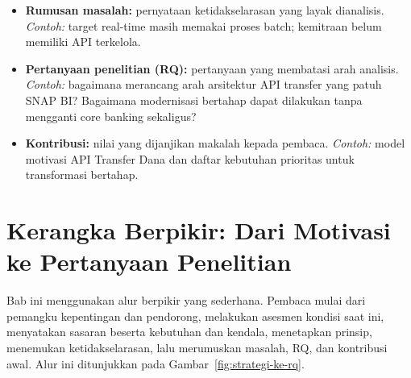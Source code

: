 \begin{itemize}
        kepentingan. \emph{Contoh:} likuiditas UMKM dan meningkatnya kepercayaan
        terhadap layanan bank.
  \item \textbf{Rumusan masalah:} pernyataan ketidakselarasan yang layak
        dianalisis. \emph{Contoh:} target real-time masih memakai proses batch;
        kemitraan belum memiliki API terkelola.
  \item \textbf{Pertanyaan penelitian (RQ):} pertanyaan yang membatasi arah
        analisis. \emph{Contoh:} bagaimana merancang arah arsitektur API
        transfer yang patuh SNAP BI? Bagaimana modernisasi bertahap dapat
        dilakukan tanpa mengganti core banking sekaligus?
  \item \textbf{Kontribusi:} nilai yang dijanjikan makalah kepada pembaca.
        \emph{Contoh:} model motivasi API Transfer Dana dan daftar kebutuhan
        prioritas untuk transformasi bertahap.
\end{itemize}

\section{Kerangka Berpikir: Dari Motivasi ke Pertanyaan Penelitian}

Bab ini menggunakan alur berpikir yang sederhana. Pembaca mulai dari pemangku
kepentingan dan pendorong, melakukan asesmen kondisi saat ini, menyatakan
sasaran beserta kebutuhan dan kendala, menetapkan prinsip, menemukan
ketidakselarasan, lalu merumuskan masalah, RQ, dan kontribusi awal. Alur ini
ditunjukkan pada Gambar~\ref{fig:strategi-ke-rq}.

